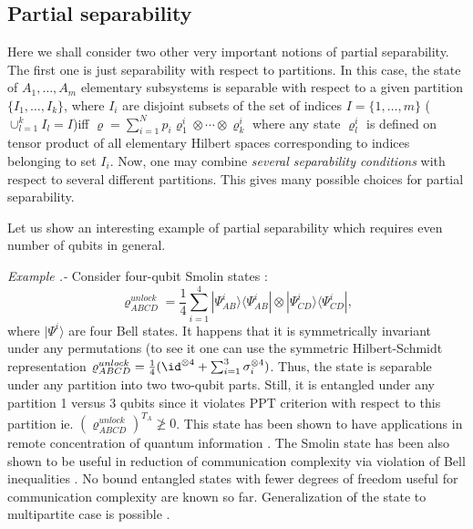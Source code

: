 \documentclass[twocolumn,aps,rmp]{revtex4}
\begin{document}
\subsection{Partial separability \label{subsec:PartialSep}}

Here we shall consider two other very important notions of partial
separability.  The first one is just separability with respect to
partitions.  In this case, the state of $A_{1},\ldots,A_{m}$
elementary subsystems is separable with respect to a given partition
$\{ I_{1}, \ldots, I_{k} \}$, where $I_{i}$ are disjoint subsets of the
set of indices $I=\{ 1, \ldots, m\}$ ($\cup_{l=1}^{k} I_{l} =I$)iff
$\varrho=\sum_{i=1}^{N}p_{i} \varrho^{i}_{1} \otimes \cdots \otimes
\varrho^{i}_{k}$ where any state $\varrho^{i}_{l}$ is defined on
tensor product of all elementary Hilbert spaces corresponding to
indices belonging to set $I_{i}$. Now, one may combine {\it several
  separability conditions} with respect to several different
partitions. This gives many possible choices for partial separability.

Let us show an interesting example of partial separability
which requires even number of qubits in general.

{\it Example .- } Consider four-qubit Smolin states \cite{Smolin}:
\begin{equation}
\varrho^{unlock}_{ABCD}=\frac{1}{4}\sum_{i=1}^{4}
|\Psi^{i}_{AB}\rangle\langle\Psi^{i}_{AB} | \otimes
|\Psi^{i}_{CD}\rangle\langle\Psi^{i}_{CD} |, \label{SmolinS}
\end{equation}
where $|\Psi^{i}\rangle$ are four Bell states. It happens that it is
symmetrically  invariant under any permutations (to see it one can
use the symmetric Hilbert-Schmidt representation
$\varrho^{unlock}_{ABCD}=\frac{1}{4}(\id^{\otimes 4} + \sum_{i=1}^{3}
\sigma^{\otimes 4}_{i})$. Thus, the state is separable under any
partition into two two-qubit parts. Still, it is entangled under any
partition 1 versus 3 qubits since it violates PPT criterion
with respect to this partition ie.
$(\varrho^{unlock}_{ABCD})^{T_{A}}\not\geq 0$. This state has
been shown to have applications in remote concentration of quantum
information \cite{MuraoV1999-concentration}. The Smolin state has
been also shown to be useful in reduction of communication
complexity via violation of Bell inequalities \cite{AugusiakBell}.
No bound entangled states with fewer degrees of freedom
useful for communication complexity are known so far. Generalization
of the state to multipartite case is possible
\cite{LidarWBS,AugusiakGSS}.
\end{document}

